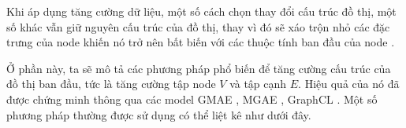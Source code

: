 Khi áp dụng tăng cường dữ liệu, một số cách chọn thay đổi cấu trúc đồ thị, một số khác vẫn giữ nguyên cấu trúc của đồ thị, thay vì đó sẽ xáo trộn nhỏ các đặc trưng của node khiến nó trở nên bất biến với các thuộc tính ban đầu của node \cite{survey:aug-for-dgl, survey:ssl-for-rec-sys}.

Ở phần này, ta sẽ mô tả các phương pháp phổ biến để tăng cường cấu trúc của đồ thị ban đầu, tức là tăng cường tập node $V$ và tập cạnh $E$. Hiệu quả của nó đã được chứng minh thông qua các model GMAE \cite{GMAE}, MGAE \cite{MGAE}, GraphCL \cite{GraphCL}. Một số phương pháp thường được sử dụng có thể liệt kê như dưới đây.

